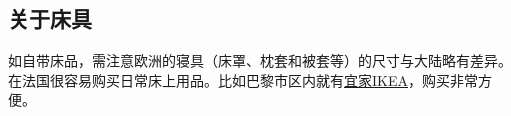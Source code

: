 \subsection{关于床具}
如自带床品，需注意欧洲的寝具（床罩、枕套和被套等）的尺寸与大陆略有差异。在法国很容易购买日常床上用品。比如巴黎市区内就有\href{https://goo.gl/maps/zMbCesV2jhi92mcK9}{宜家IKEA}，购买非常方便。
